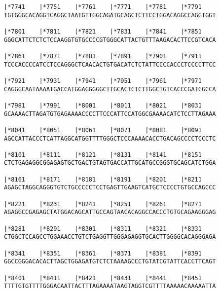 \documentclass{article}
\begin{document}
\begin{Verbatim}
|*7741    |*7751    |*7761    |*7771    |*7781    |*7791    
TGTGGGCACAGGTCAGGCTAATGTTGGCAGATGCAGCTCTTCCTGGACAGGCCAGGTGGT
                                                            
|*7801    |*7811    |*7821    |*7831    |*7841    |*7851    
GGGCATTCTCTCTCCAAGGTGTGCCCCGTGGGCATTACTGTTTAAGACACTTCCGTCACA
                                                            
|*7861    |*7871    |*7881    |*7891    |*7901    |*7911    
TCCCACCCCATCCTCCAGGGCTCAACACTGTGACATCTCTATTCCCCACCCTCCCCTTCC
                                                            
|*7921    |*7931    |*7941    |*7951    |*7961    |*7971    
CAGGGCAATAAAATGACCATGGAGGGGGCTTGCACTCTCTTGGCTGTCACCCGATCGCCA
                                                            
|*7981    |*7991    |*8001    |*8011    |*8021    |*8031    
GCAAAACTTAGATGTGAGAAAACCCCTTCCCATTCCATGGCGAAAACATCTCCTTAGAAA
                                                            
|*8041    |*8051    |*8061    |*8071    |*8081    |*8091    
AGCCATTACCCTCATTAGGCATGGTTTTGGGCTCCCAAAACACCTGACAGCCCCTCCCTC
                                                            
|*8101    |*8111    |*8121    |*8131    |*8141    |*8151    
CTCTGAGAGGCGGAGAGTGCTGACTGTAGTGACCATTGCATGCCGGGTGCAGCATCTGGA
                                                            
|*8161    |*8171    |*8181    |*8191    |*8201    |*8211    
AGAGCTAGGCAGGGTGTCTGCCCCCTCCTGAGTTGAAGTCATGCTCCCCTGTGCCAGCCC
                                                            
|*8221    |*8231    |*8241    |*8251    |*8261    |*8271    
AGAGGCCGAGAGCTATGGACAGCATTGCCAGTAACACAGGCCACCCTGTGCAGAAGGGAG
                                                            
|*8281    |*8291    |*8301    |*8311    |*8321    |*8331    
CTGGCTCCAGCCTGGAAACCTGTCTGAGGTTGGGAGAGGTGCACTTGGGGCACAGGGAGA
                                                            
|*8341    |*8351    |*8361    |*8371    |*8381    |*8391    
GGCCGGGACACACTTAGCTGGAGATGTCTCTAAAAGCCCTGTATCGTATTCACCTTCAGT
                                                            
|*8401    |*8411    |*8421    |*8431    |*8441    |*8451    
TTTTGTGTTTTGGGACAATTACTTTAGAAAATAAGTAGGTCGTTTTAAAAACAAAAATTA
                                                            

\end{Verbatim}
\end{document}
